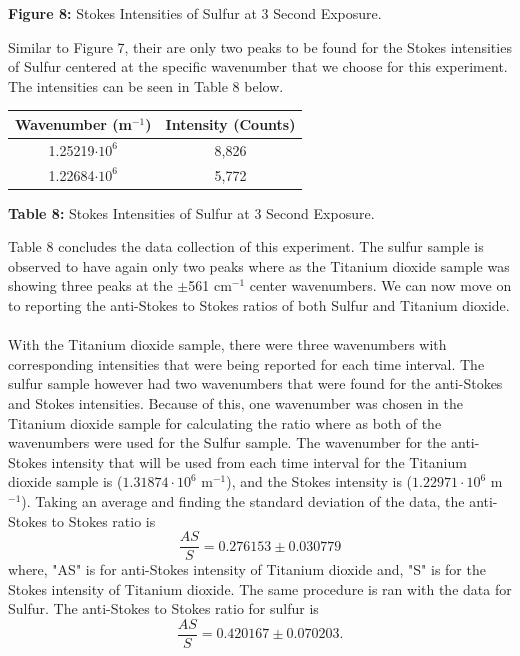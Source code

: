 \documentclass[12pt]{article}
\begin{document}
\begin{multicols}{2}
\begin{center}
    \caption{\textbf{\small{Figure 8:}} \small{Stokes Intensities of Sulfur at 3 Second Exposure.}}
\end{center}
Similar to Figure 7, their are only two peaks to be found for the Stokes intensities of Sulfur centered at the specific wavenumber that we choose for this experiment. The intensities can be seen in Table 8 below.
\newline
\begin{tabular}{|c|c|}
    \hline \textbf{Wavenumber (m$^{-1}$)} & \textbf{Intensity (Counts)} \\ \hline
    1.25219$\cdot10^6$ & 8,826 \\ \hline
    1.22684$\cdot10^6$ & 5,772 \\ \hline
\end{tabular}
\centerline{\tiny\textbf{{Table 8:}} \tiny{Stokes Intensities of Sulfur at 3 Second Exposure.}}
\newline
Table 8 concludes the data collection of this experiment. The sulfur sample is observed to have again only two peaks where as the Titanium dioxide sample was showing three peaks at the $\pm$561 cm$^{-1}$ center wavenumbers. We can now move on to reporting the anti-Stokes to Stokes ratios of both Sulfur and Titanium dioxide.
\paragraph{}
\setlength{\parskip}{1em}
With the Titanium dioxide sample, there were three wavenumbers with corresponding intensities that were being reported for each time interval. The sulfur sample however had two wavenumbers that were found for the anti-Stokes and Stokes intensities. Because of this, one wavenumber was chosen in the Titanium dioxide sample for calculating the ratio where as both of the wavenumbers were used for the Sulfur sample. The wavenumber for the anti-Stokes intensity that will be used from each time interval for the Titanium dioxide sample is ($1.31874\cdot10^6$ m$^{-1}$), and the Stokes intensity is ($1.22971\cdot10^6$ m$^{-1}$). Taking an average and finding the standard deviation of the data, the anti-Stokes to Stokes ratio is
\begin{equation}\label{1}
    \frac{AS}{S}=0.276153 \pm 0.030779
\end{equation}
where, "AS" is for anti-Stokes intensity of Titanium dioxide and, "S" is for the Stokes intensity of Titanium dioxide. The same procedure is ran with the data for Sulfur. The anti-Stokes to Stokes ratio for sulfur is
\begin{equation}\label{2}
    \frac{AS}{S}=0.420167 \pm 0.070203.
\end{equation}
\end{multicols}
\end{document}
